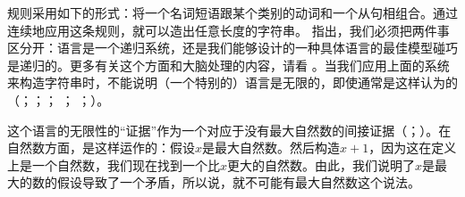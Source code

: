 \zl
规则采用如下的形式：将一个名词短语跟某个类别的动词和一个从句相组合。通过连续地应用这条规则，就可以造出任意长度的字符串。 \citet{PS2010a}指出，我们必须把两件事区分开：语言是一个递归系统，还是我们能够设计的一种具体语言的最佳模型碰巧是递归的。更多有关这个方面和大脑处理的内容，请看 。当我们应用上面的系统来构造字符串时，不能说明（一个特别的）语言是无限的，即使通常是这样认为的（\citealp[--106]{Bierwisch66a}；\citealp[]{Pinker94a}；\citealp*[]{HCF2002a}； \citealp[]{MuellerLehrbuch1}；
\citealp*[]{HNG2005a}；\citealp[]{KS2008a-u}）。

这个语言的无限性的“证据”作为一个对应于没有最大自然数的间接证据（\citealp[--106]{Bierwisch66a}；\citealp[]{Pinker94a}）。在自然数方面，是这样运作的：假设$x$是最大自然数。然后构造$x + 1$，因为这在定义上是一个自然数，我们现在找到一个比$x$更大的自然数。由此，我们说明了$x$是最大的数的假设导致了一个矛盾，所以说，就不可能有最大自然数这个说法。

